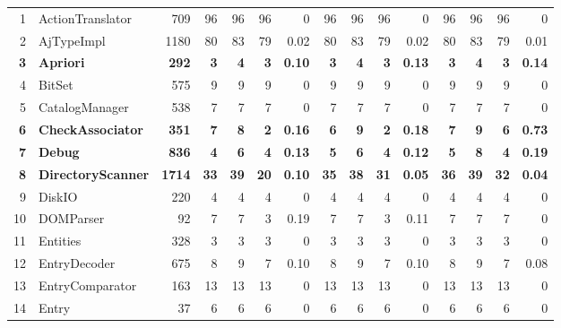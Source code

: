 \begin{table} [htp!]
{\begin{tabularx}{1 \textwidth}{r l r r r r r r r r r r r r r}
1						& ActionTranslator			&709		& 96		&	96	&	96	& 	0					& 96		& 96 		& 96		& 		0			& 96			& 96			& 96			&	0\\     
2						& AjTypeImpl				&1180		& 80		&	83	&	79	& 	0.02					& 80		& 83 		& 79		& 		0.02			& 80			& 83			& 79			&	0.01\\      
\textbf{3}					& \textbf{Apriori}			&\textbf{292}	& \textbf{3}&	\textbf{4}	&\textbf{3}	& \textbf{0.10}			& \textbf{3}& \textbf{4} 		& \textbf{3}& \textbf{0.13}	& \textbf{3}	& \textbf{4}	& \textbf{3}	&\textbf{0.14}\\      
4						& BitSet					&575		& 9		&	9	&	9	& 	0					& 9		& 9 		& 9		& 		0			& 9			& 9			& 9			&	0\\       
5						& CatalogManager			&538		& 7		&	7	&	7	& 	0					& 7		& 7 		& 7		& 		0			& 7			& 7			& 7			&	0\\    
\textbf{6}					& \textbf{CheckAssociator}	&\textbf{351}	& \textbf{7}	&	\textbf{8}	&	\textbf{2}	& 	\textbf{0.16}					& \textbf{6}		& \textbf{9} 		& \textbf{2}		& 		\textbf{0.18}			& \textbf{7}			& \textbf{9}			& \textbf{6}			&	\textbf{0.73}\\    
\textbf{7}						& \textbf{Debug}					&\textbf{836}		& \textbf{4}		&	\textbf{6}	&	\textbf{4}	& 	\textbf{0.13}					& \textbf{5}		& \textbf{6} 		& \textbf{4}		& 		\textbf{0.12}			& \textbf{5}			& \textbf{8}			& \textbf{4}			&	\textbf{0.19}\\       
\textbf{8}						& \textbf{DirectoryScanner}			&\textbf{1714}		& \textbf{33}		&	\textbf{39}	&	\textbf{20}	& 	\textbf{0.10}					& \textbf{35}		& \textbf{38} 		& \textbf{31}		& 		\textbf{0.05}			& \textbf{36}			& \textbf{39}			& \textbf{32}			&	\textbf{0.04}\\      
9						& DiskIO					&220		& 4		&	4	&	4	& 	0					& 4		& 4 		& 4		& 		0			& 4			& 4			& 4			&	0\\      
10						& DOMParser				&92			& 7		&	7	&	3	& 	0.19					& 7		& 7 		& 3		& 		0.11			& 7			& 7			& 7			&	0\\      
11						& Entities					&328		& 3		&	3	&	3	& 	0					& 3		& 3 		& 3		& 		0			& 3			& 3			& 3			&	0\\      
12						& EntryDecoder			&675		& 8		&	9	&	7	& 	0.10					& 8		& 9 		& 7		& 		0.10			& 8			& 9			& 7			&	0.08\\   
13						& EntryComparator			&163		& 13		&	13	&	13	& 	0					& 13		& 13 		& 13		& 		0			& 13			& 13			& 13			&	0\\      
14						& Entry					&37			& 6		&	6	&	6	& 	0					& 6		& 6 		& 6		& 		0			& 6			& 6			& 6			&	0\\   

\end{tabularx}}
\end{table}
